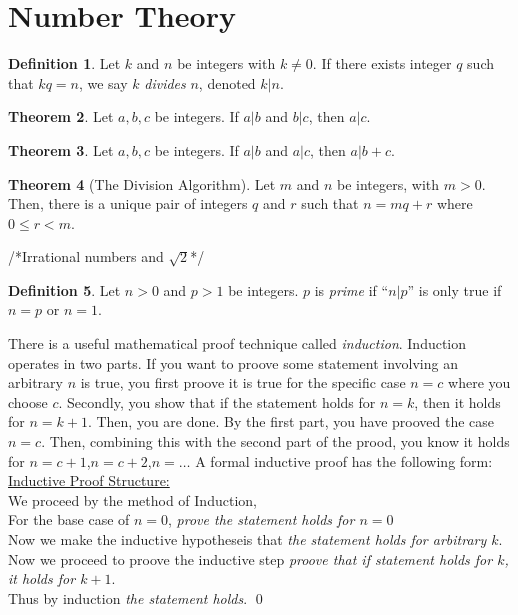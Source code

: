 \documentclass[11pt]{article}
\theoremstyle{definition}
\newtheorem{theorem}{Theorem}[section]
\newtheorem{definition}[theorem]{Definition}
\begin{document}
\section{Number Theory}
\begin{definition}
    Let $k$ and $n$ be integers with $k \neq 0$. If there exists integer $q$ such that $kq=n$, we say $k$ \emph{divides} $n$, denoted $k \vert n$.
\end{definition}
\begin{theorem}
    Let $a,b,c$ be integers. If $a \vert b$ and $b \vert c$, then $a \vert c$.
\end{theorem}
\begin{theorem}
    Let $a,b,c$ be integers. If $a \vert b$ and $a \vert c$, then $a \vert b+c$.
\end{theorem}
\begin{theorem} [The Division Algorithm]
    Let $m$ and $n$ be integers, with $m>0$. Then, there is a unique pair of integers $q$ and $r$ such that $n = mq+r$ where $0 \leq r < m$. 
\end{theorem}
/*Irrational numbers and $\sqrt{2}$*/
\begin{definition}
    Let $n > 0$ and $p > 1$ be integers. $p$ is \emph{prime} if ``$n\vert p$'' is only true if $n=p$ or $n=1$.
\end{definition}
There is a useful mathematical proof technique called \emph{induction}. Induction operates in two parts. If you want to proove some statement involving an arbitrary $n$ is true, you first proove it is true for the specific case $n=c$ where you choose $c$. Secondly, you show that if the statement holds for $n=k$, then it holds for $n=k+1$. Then, you are done. By the first part, you have prooved the case $n=c$. Then, combining this with the second part of the prood, you know it holds for $n=c+1$,$n=c+2$,$n=\dots$ A formal inductive proof has the following form:\\
\underline{Inductive Proof Structure:} \\
    We proceed by the method of Induction, \\
    For the base case of $n=0$, \emph{prove the statement holds for $n=0$} \\
    Now we make the inductive hypotheseis that \emph{the statement holds for arbitrary $k$}. \\
    Now we proceed to proove the inductive step \emph{proove that if statement holds for $k$, it holds for $k+1$}. \\
    Thus by induction \emph{the statement holds}. \qed
\end{document}
